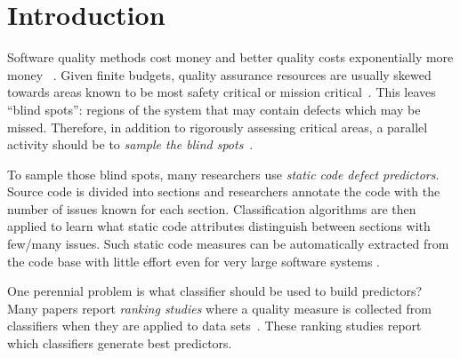 \documentclass[sigconf]{acmart}
\theoremstyle{break}
\begin{document}




\maketitle


\section{Introduction}
\label{sect:intro}

Software quality methods cost money and better quality costs exponentially more money ~\cite{voas1995software, fu2016tuning}. Given finite budgets, quality assurance resources are usually 
skewed towards areas known to be most safety critical or mission critical~\cite{lowry1998towards}. This leaves ``blind spots'': regions of the system that may contain defects which may be missed. Therefore, in addition to rigorously assessing  critical areas, a parallel activity should be to {\em sample the blind spots}~\cite{Menzies04}. 

To sample those blind spots, many researchers  use  {\em static code defect predictors}.
Source code is divided into sections and researchers annotate the code with the number of issues known for each section.
Classification algorithms are then applied to learn what static code attributes
distinguish 
between sections with few/many issues.
Such static code measures can be automatically extracted from
the code base with little effort even for very large software
systems \cite{nagappan2005static}.  




One perennial problem   is what classifier should be used to build     predictors?
Many papers report {\em ranking studies} where
a quality measure  is collected from    classifiers when they are 
 applied to data sets~\cite{lessmann2008benchmarking,hall2012systematic,elish2008predicting,menzies2010defect,gondra2008applying,radjenovic2013software,jiang2008techniques,wang2013using,mende2009revisiting,li2012sample,khoshgoftaar2010attribute,jiang2009variance,ghotra2015revisiting,jiang2008can,tantithamthavorn2016automated,fu2016tuning,fu2017revisiting}.
These ranking studies report which   classifiers
 generate  best predictors.
 
\end{document}
